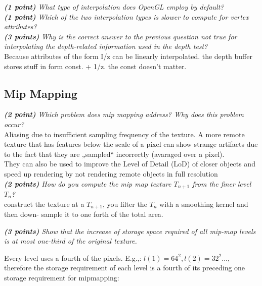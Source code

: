 \documentclass[a4paper,10pt]{article}
\begin{document}

\textit{\textbf{(1 point)} What type of interpolation  does OpenGL employ by default?}\\


\textit{\textbf{(1 point)} Which of the two interpolation types is slower to compute for vertex attributes?}\\


\textit{\textbf{(3 points)} Why is the correct answer to the previous question not true for interpolating the depth-related information used in the depth test?}\\


Because attributes of the form I/z can be linearly interpolated. the depth buffer stores stuff in form const. + 1/z. the const doesn't matter.

\subsection{Mip Mapping}
\textit{\textbf{(2 point)} Which problem does mip mapping address? Why does this problem occur?}\\

Aliasing due to insufficient sampling frequency of the texture. A more remote texture
that has features below the scale of a pixel can show strange artifacts due to the fact that they are „sampled“ incorrectly (avaraged over a pixel). \\

They can also be used to improve the Level of Detail (LoD) of closer objects and speed up rendering
by not rendering remote objects in full resolution\\

\textit{\textbf{(2 points)} How do you compute the mip map texture $T_{n+1}$ from the finer level $T_n$?}\\

construct the texture at a $T_{n+1}$, you filter the $T_n$ with a smoothing kernel and then down- sample it to one forth of the total area.

\textit{\textbf{(3 points)} Show that the increase of storage space required of all mip-map levels is at most one-third of the original texture.}

Every level uses a fourth of the pixels. E.g.,:
$l(1)=64^2,l(2)=32^2...$, therefore the storage requirement of each level is a fourth of its preceding one storage requirement for mipmapping: 
\end{document}

